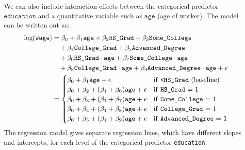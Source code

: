 \documentclass[10pt]{beamer}\usepackage[]{graphicx}\usepackage[]{color}
\begin{document}
\begin{frame}
We can also include interaction effects between the categorical predictor $\texttt{education}$ and a quantitative variable such as $\texttt{age}$ (age of worker).  The model can be written out as:
\small 
\begin{align*}
\log(\texttt{Wage}) &= \beta_0 + \beta_1 \texttt{age} 
+ \beta_2 \texttt{HS\_Grad} + \beta_3 \texttt{Some\_College}\\ 
& \quad + \beta_4 \texttt{College\_Grad} +\beta_5 \texttt{Advanced\_Degree}\\ 
& \quad + \beta_6 \texttt{HS\_Grad} \cdot \texttt{age}
+ \beta_7 \texttt{Some\_College} \cdot \texttt{age}\\
& \quad + \beta_8 \texttt{College\_Grad} \cdot \texttt{age}
+ \beta_9 \texttt{Advanced\_Degree} \cdot \texttt{age} + e\\
&= \begin{cases}
\beta_0 + \beta_1 \texttt{age} + e & \text{if  \texttt{<HS\_Grad} (baseline)}\\
\beta_0 + \beta_2 + (\beta_1 + \beta_6) \texttt{age} + e & \text{if \texttt{HS\_Grad}  = 1}\\
\beta_0 + \beta_3 + (\beta_1 + \beta_7) \texttt{age} + e & \text{if \texttt{Some\_College}  = 1}\\
\beta_0 + \beta_4 + (\beta_1 + \beta_8) \texttt{age} + e & \text{if \texttt{College\_Grad}  = 1}\\
\beta_0 + \beta_5 + (\beta_1 + \beta_9) \texttt{age} + e & \text{if \texttt{Advanced\_Degree}  = 1}
\end{cases}
\end{align*}
The regression model gives separate regression lines, which have different slopes and intercepts, for each level of the categorical predictor \texttt{education}.
\end{frame}
\end{document}
